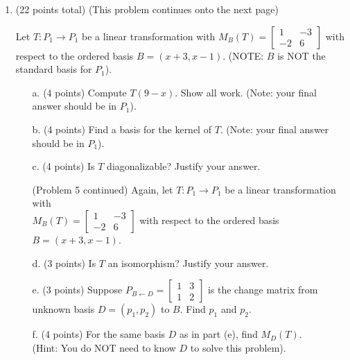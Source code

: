 \documentclass[12pt]{extarticle}
\begin{document}
\begin{enumerate}
  
    
    \newpage

    
\item (22 points total) (This problem continues onto the next page) 

Let $T:P_1\to P_1$ be a linear transformation with $M_B(T)=\begin{bmatrix} 1 & -3\\ -2 & 6\end{bmatrix}$ with respect to the ordered basis $B=(x+3,x-1)$. (NOTE: $B$ is NOT the standard basis for $P_1$).

\begin{itemize}
\item[a.] (4 points) Compute $T(9-x)$. Show all work. (Note: your final answer should be in $P_1$). 


\vspace{3in}

\item[b.] (4 points) Find a basis for the kernel of $T$. (Note: your final answer should be in $P_1$).  


\vspace{2.5in}



\item[c.] (4 points) Is $T$ diagonalizable? Justify your answer.

\vspace{2in}

\newpage

(Problem 5 continued)  Again, let $T:P_1\to P_1$ be a linear transformation with \\$M_B(T)=\begin{bmatrix} 1 & -3\\ -2 & 6\end{bmatrix}$ with respect to the ordered basis $B=(x+3,x-1)$.

\item[d.] (3 points) Is $T$ an isomorphism? Justify your answer. 
\vspace{1.5in}

\item[e.] (3 points) Suppose $P_{B\leftarrow D}=\begin{bmatrix} 1 & 3 \\ 1 & 2\end{bmatrix}$ is the change matrix from unknown basis $D=(p_1,p_2)$ to $B$. Find $p_1$ and $p_2$.

\vspace{2in}

\item[f.] (4 points) For the same basis $D$  as in part (e), find $M_D(T)$.\\ (Hint: You do NOT need to know $D$ to solve this problem).


\end{itemize}
\end{enumerate}
\end{document}
